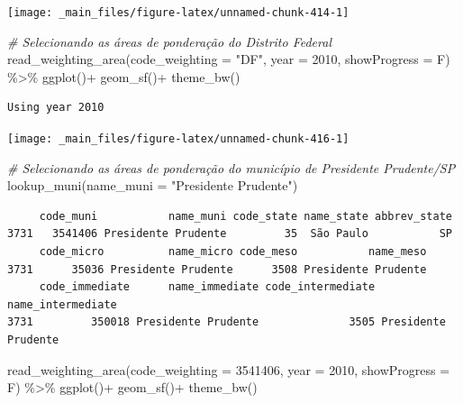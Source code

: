 \documentclass[
  brazilian,
]{book}
\newenvironment{Shaded}{\begin{snugshade}}{\end{snugshade}}
\newcommand{\AttributeTok}[1]{\textcolor[rgb]{0.77,0.63,0.00}{#1}}
\newcommand{\CommentTok}[1]{\textcolor[rgb]{0.56,0.35,0.01}{\textit{#1}}}
\newcommand{\DecValTok}[1]{\textcolor[rgb]{0.00,0.00,0.81}{#1}}
\newcommand{\FunctionTok}[1]{\textcolor[rgb]{0.00,0.00,0.00}{#1}}
\newcommand{\NormalTok}[1]{#1}
\newcommand{\SpecialCharTok}[1]{\textcolor[rgb]{0.00,0.00,0.00}{#1}}
\newcommand{\StringTok}[1]{\textcolor[rgb]{0.31,0.60,0.02}{#1}}
\begin{document}
\begin{center}\texttt{[image: \_main\_files/figure-latex/unnamed-chunk-414-1]} \end{center}

\begin{Shaded}
\begin{Highlighting}[]
\CommentTok{\# Selecionando as áreas de ponderação do Distrito Federal}
\FunctionTok{read\_weighting\_area}\NormalTok{(}\AttributeTok{code\_weighting =} \StringTok{"DF"}\NormalTok{,}
                    \AttributeTok{year =} \DecValTok{2010}\NormalTok{,}
                    \AttributeTok{showProgress =}\NormalTok{ F) }\SpecialCharTok{\%\textgreater{}\%}
  \FunctionTok{ggplot}\NormalTok{()}\SpecialCharTok{+}
  \FunctionTok{geom\_sf}\NormalTok{()}\SpecialCharTok{+}
  \FunctionTok{theme\_bw}\NormalTok{()}
\end{Highlighting}
\end{Shaded}

\begin{verbatim}
Using year 2010
\end{verbatim}

\begin{center}\texttt{[image: \_main\_files/figure-latex/unnamed-chunk-416-1]} \end{center}

\begin{Shaded}
\begin{Highlighting}[]
\CommentTok{\# Selecionando as áreas de ponderação do município de Presidente Prudente/SP}
\FunctionTok{lookup\_muni}\NormalTok{(}\AttributeTok{name\_muni =} \StringTok{"Presidente Prudente"}\NormalTok{)}
\end{Highlighting}
\end{Shaded}

\begin{verbatim}
     code_muni           name_muni code_state name_state abbrev_state
3731   3541406 Presidente Prudente         35  São Paulo           SP
     code_micro          name_micro code_meso           name_meso
3731      35036 Presidente Prudente      3508 Presidente Prudente
     code_immediate      name_immediate code_intermediate   name_intermediate
3731         350018 Presidente Prudente              3505 Presidente Prudente
\end{verbatim}

\begin{Shaded}
\begin{Highlighting}[]
\FunctionTok{read\_weighting\_area}\NormalTok{(}\AttributeTok{code\_weighting =} \DecValTok{3541406}\NormalTok{,}
                    \AttributeTok{year =} \DecValTok{2010}\NormalTok{,}
                    \AttributeTok{showProgress =}\NormalTok{ F) }\SpecialCharTok{\%\textgreater{}\%}
  \FunctionTok{ggplot}\NormalTok{()}\SpecialCharTok{+}
  \FunctionTok{geom\_sf}\NormalTok{()}\SpecialCharTok{+}
  \FunctionTok{theme\_bw}\NormalTok{()}
\end{Highlighting}
\end{Shaded}
\end{document}
